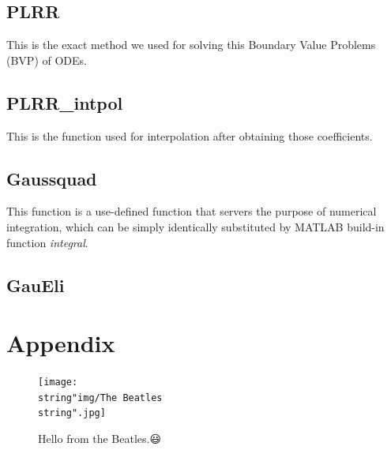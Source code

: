 \documentclass[a4paper,english]{article}
\begin{document}
	
	
	\subsection{PLRR}
	This is the exact method we used for solving this Boundary Value Problems 
	(BVP) of ODEs. 
	
	
	\subsection{PLRR\_intpol}
	This is the function used for interpolation after obtaining those
	coefficients.
	
	
	\subsection{Gaussquad}
	This function is a use-defined function that servers the purpose of 
	numerical integration, which can be simply identically substituted by
	MATLAB build-in function \emph{integral}.
	
	
	\subsection{GauEli}	
	
	
	
	
	\section{Appendix}
	\begin{figure}[!hb]
		\centering
		\texttt{[image: \\string"img/The 
		Beatles\\string".jpg]}
		\caption*{Hello from the Beatles.😃}
		\label{fig:the-beatles}
	\end{figure}
	
\end{document}
